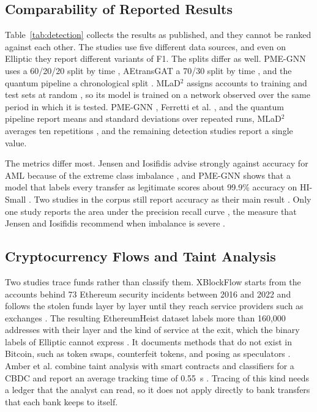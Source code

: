 \documentclass[journal]{IEEEtran}
\begin{document}
\subsection{Comparability of Reported Results}
\label{sec:comparability}

Table~\ref{tab:detection} collects the results as published, and they cannot be ranked against each other. The studies use five different data sources, and even on Elliptic they report different variants of F1. The splits differ as well. PME-GNN uses a 60/20/20 split by time \cite{mao2026pmegnn}, AEtransGAT a 70/30 split by time \cite{yu2023aetransgat}, and the quantum pipeline a chronological split \cite{nayak2026quantum}. MLaD$^2$ assigns accounts to training and test sets at random \cite{luo2024mlad}, so its model is trained on a network observed over the same period in which it is tested. PME-GNN \cite{mao2026pmegnn}, Ferretti et al. \cite{ferretti2025gnn}, and the quantum pipeline \cite{nayak2026quantum} report means and standard deviations over repeated runs, MLaD$^2$ averages ten repetitions \cite{luo2024mlad}, and the remaining detection studies report a single value.

The metrics differ most. Jensen and Iosifidis advise strongly against accuracy for AML because of the extreme class imbalance \cite{jensen2023fighting}, and PME-GNN shows that a model that labels every transfer as legitimate scores about 99.9\% accuracy on HI-Small \cite{mao2026pmegnn}. Two studies in the corpus still report accuracy as their main result \cite{amber2026cbdc,awosika2024xai}. Only one study reports the area under the precision recall curve \cite{tang2024sdt}, the measure that Jensen and Iosifidis recommend when imbalance is severe \cite{jensen2023fighting}.

\subsection{Cryptocurrency Flows and Taint Analysis}

Two studies trace funds rather than classify them. XBlockFlow starts from the accounts behind 73 Ethereum security incidents between 2016 and 2022 and follows the stolen funds layer by layer until they reach service providers such as exchanges \cite{wu2024heists}. The resulting EthereumHeist dataset labels more than 160{,}000 addresses with their layer and the kind of service at the exit, which the binary labels of Elliptic cannot express \cite{wu2024heists}. It documents methods that do not exist in Bitcoin, such as token swaps, counterfeit tokens, and posing as speculators \cite{wu2024heists}. Amber et al. combine taint analysis with smart contracts and classifiers for a CBDC and report an average tracking time of 0.55~s \cite{amber2026cbdc}. Tracing of this kind needs a ledger that the analyst can read, so it does not apply directly to bank transfers that each bank keeps to itself.
\end{document}
